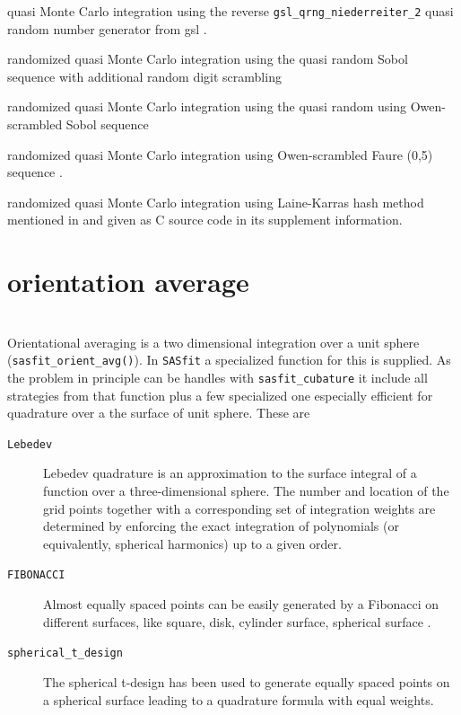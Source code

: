 \begin{description}[font=\sffamily\bfseries, leftmargin=2.5cm,style=nextline,
                  nosep]
   \item[\texttt{QMC\_NIEDERREITER\_2}] quasi Monte Carlo integration \cite{Zaslavsky2023} using the reverse \texttt{gsl\_qrng\_niederreiter\_2} quasi random number generator from gsl \cite{Galassi2021}.
   \item[\texttt{RQMC\_SOBOL\_RDS}] randomized quasi Monte Carlo integration using the quasi random Sobol sequence with additional random digit scrambling \cite{Burley2020Scrambling}
   \item[\texttt{RQMC\_SOBOL\_OWEN}] randomized quasi Monte Carlo integration using the quasi random using Owen-scrambled Sobol sequence \cite{Burley2020Scrambling,Owen1995}
   \item[\texttt{RQMC\_FAURE05}] randomized quasi Monte Carlo integration using Owen-scrambled Faure (0,5) sequence \cite{Burley2020Scrambling,Owen1995}.
   \item[\texttt{RQMC\_LAINE\_KARRAS}] randomized quasi Monte Carlo integration using Laine-Karras hash method mentioned in \cite{Burley2020Scrambling} and given as C source code in its supplement information.
\end{description}

\section{orientation average} ~\\

Orientational averaging is a two dimensional integration over a unit sphere (\texttt{sasfit\_orient\_avg()}). In \texttt{SASfit} a specialized function for this is supplied. As the problem in principle can be handles with \texttt{sasfit\_cubature} it include all strategies from that function plus a few specialized one especially efficient for quadrature over a the surface of unit sphere. These are
\begin{description}
\item[\texttt{Lebedev}] Lebedev quadrature \cite{WikiLebedevQuad2024,Lebedev1975,Lebedev1976,Lebedev1977,Lebedev2003} is an approximation to the surface integral of a function over a three-dimensional sphere. The number and location of the grid points together with a corresponding set of integration weights are determined by enforcing the exact integration of polynomials (or equivalently, spherical harmonics) up to a given order.
\item[\texttt{FIBONACCI}]  Almost equally spaced points can be easily generated by a Fibonacci on different surfaces, like square, disk, cylinder surface, spherical surface \cite{Marques_2013,Swinbank2006}.
\item[\texttt{spherical\_t\_design}] The spherical t-design \cite{WikipediaSphericalDesign2024,Graef2011,Hardin1996} has been used to generate equally spaced points on a spherical surface leading to a quadrature formula with equal weights.
\end{description}

